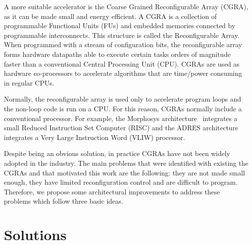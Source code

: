 A more suitable accelerator is the Coarse Grained Reconfigurable Array
(CGRA), as it can be made small and energy efficient. A CGRA is a
collection of programmable Functional Units (FUs) and embedded memories
connected by programmable interconnects. This structure is called the
Reconfigurable Array. When programmed with a stream of configuration
bits, the reconfigurable array forms hardware datapaths able to
execute certain tasks orders of magnitude faster than a conventional
Central Processing Unit (CPU). CGRAs are used as hardware
co-processors to accelerate algorithms that are time/power consuming
in regular CPUs.

Normally, the reconfigurable array is used only to accelerate program
loops and the non-loop code is run on a CPU. For this reason, CGRAs
normally include a conventional processor. For example, the Morphosys
architecture~\cite{Lee00} integrates a small Reduced Instruction Set
Computer (RISC) and the ADRES architecture~\cite{Mei05} integrates a
Very Large Instruction Word (VLIW) processor.

Despite being an obvious solution, in practice CGRAs have not been
widely adopted in the industry. The main problems that were identified
with existing the CGRAs and that motivated this work are the
following: they are not made small enough, they have limited
reconfiguration control and are difficult to program. Therefore, we
propose some architectural improvements to address these problems
which follow three basic ideas.

\section{Solutions}

